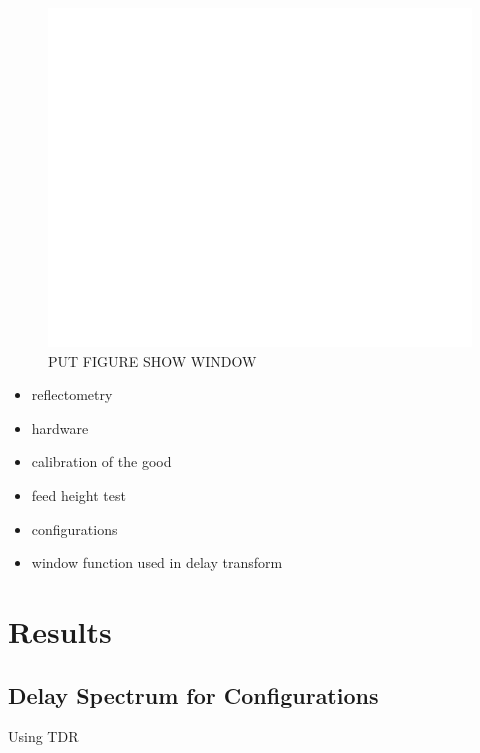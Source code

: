 \documentclass[preprint]{aastex}  %
\begin{document}
\begin{figure}[H]
	\begin{center}
	\includegraphics[width =\textwidth]{empty}
	\caption{PUT FIGURE SHOW WINDOW 
\label{Fig:} }
	\end{center}
\end{figure}


\begin{itemize}
\item reflectometry 
\item hardware 
\item calibration of the good
\item feed height test
\item configurations
\item window function used in delay transform
\end{itemize}

\section{Results}
\label{sec:results}
\subsection{Delay Spectrum for Configurations}
Using TDR 
\end{document}
